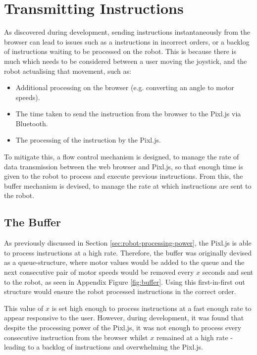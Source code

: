 \documentclass{l4proj}
\begin{document}
\section{Transmitting Instructions}\label{sec:buffer-design}
As discovered during development, sending instructions instantaneously from the browser can lead to issues such as a instructions in incorrect orders, or a backlog of instructions waiting to be processed on the robot. This is because there is much which needs to be considered between a user moving the joystick, and the robot actualising that movement, such as:
\begin{itemize}
    \item Additional processing on the browser (e.g. converting an angle to motor speeds).
    \item The time taken to send the instruction from the browser to the Pixl.js via Bluetooth.
    \item The processing of the instruction by the Pixl.js.
\end{itemize}

To mitigate this, a flow control mechanism is designed, to manage the rate of data transmission between the web browser and Pixl.js, so that enough time is given to the robot to process and execute previous instructions. From this, the buffer mechanism is devised, to manage the rate at which instructions are sent to the robot.

\subsection{The Buffer}
As previously discussed in Section \ref{sec:robot-processing-power}, the Pixl.js is able to process instructions at a high rate. Therefore, the buffer was originally devised as a queue-structure, where motor values would be added to the queue and the next consecutive pair of motor speeds would be removed every $x$ seconds and sent to the robot, as seen in Appendix Figure \ref{fig:buffer}. Using this first-in-first out structure would ensure the robot processed instructions in the correct order. 

This value of $x$ is set high enough to process instructions at a fast enough rate to appear responsive to the user. However, during development, it was found that despite the processing power of the Pixl.js, it was not enough to process every consecutive instruction from the browser whilst $x$ remained at a high rate - leading to a backlog of instructions and overwhelming the Pixl.js.
\end{document}
